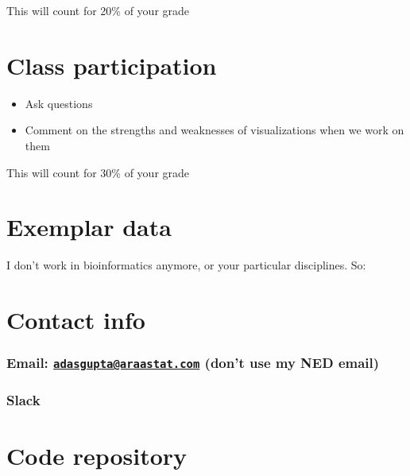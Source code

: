 \documentclass[12pt,letterpaperpaper,openany]{book}
\providecommand{\tightlist}{%
  \setlength{\itemsep}{0pt}\setlength{\parskip}{0pt}}
\begin{document}
This will count for 20\% of your grade

\hypertarget{class-participation}{%
\section{Class participation}\label{class-participation}}

\begin{itemize}
\tightlist
\item
  Ask questions
\item
  Comment on the strengths and weaknesses of visualizations when we work on them
\end{itemize}

This will count for 30\% of your grade

\hypertarget{exemplar-data}{%
\section{Exemplar data}\label{exemplar-data}}

I don't work in bioinformatics anymore, or your particular disciplines. So:

\hypertarget{contact-info}{%
\section{Contact info}\label{contact-info}}

\hypertarget{email-adasguptaaraastat.com-dont-use-my-ned-email}{%
\subsubsection{\texorpdfstring{Email: \href{mailto:adasgupta@araastat.com}{\nolinkurl{adasgupta@araastat.com}} (don't use my NED email)}{Email: adasgupta@araastat.com (don't use my NED email)}}\label{email-adasguptaaraastat.com-dont-use-my-ned-email}}

\hypertarget{slack}{%
\subsubsection{Slack}\label{slack}}

\hypertarget{code-repository}{%
\section{Code repository}\label{code-repository}}
\end{document}
